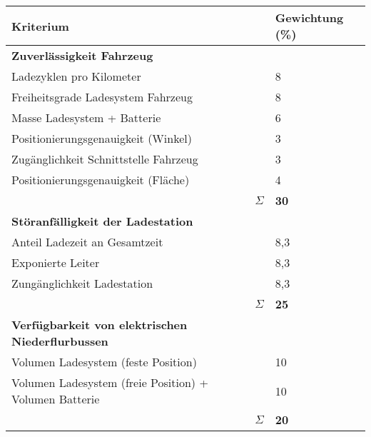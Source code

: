 \begin{table}
	\centering
	\begin{tabularx}{\linewidth}{Xrl}
		\toprule
		Kriterium                                                &                   & Gewichtung (\%) \\ \midrule
		\textbf{Zuverlässigkeit Fahrzeug}                        &                   &  \\
		Ladezyklen pro Kilometer                                 &                   & 8               \\
		Freiheitsgrade Ladesystem Fahrzeug                       &                   & 8               \\
		Masse Ladesystem + Batterie                              &                   & 6               \\
		Positionierungsgenauigkeit (Winkel)                      &                   & 3               \\
		Zugänglichkeit Schnittstelle Fahrzeug                    &                   & 3               \\
		Positionierungsgenauigkeit (Fläche)                      &                   & 4               \\ \midrule
		                                                         &          $\Sigma$ & \textbf{30}     \\
		\textbf{Störanfälligkeit der Ladestation}                &                   &  \\
		Anteil Ladezeit an Gesamtzeit                            &                   & 8,3             \\
		Exponierte Leiter                                        &                   & 8,3             \\
		Zungänglichkeit Ladestation                              &                   & 8,3 \\ \midrule
		                                                         &          $\Sigma$ & \textbf{25}     \\
		\textbf{Verfügbarkeit von elektrischen Niederflurbussen} &                   &  \\
		Volumen Ladesystem (feste Position)                      &                   & 10              \\
		Volumen Ladesystem (freie Position) + Volumen Batterie   &                   & 10              \\ \midrule
		                                                         &          $\Sigma$ & \textbf{20}     \\

\end{tabularx}
\end{table}
